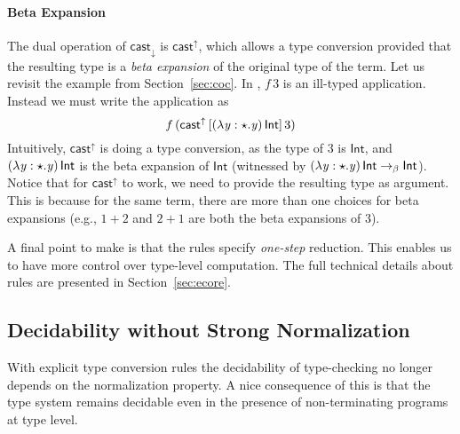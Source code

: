\paragraph{Beta Expansion} The dual operation of $ \mathsf{cast}_{\downarrow} $ is
$ \mathsf{cast}^{\uparrow} $, which allows a type conversion provided that the
resulting type is a \emph{beta expansion} of the original type of the
term.  Let us revisit the example from Section~\ref{sec:coc}. In \name,
$f\,3$ is an ill-typed application. Instead we must write the
application as
\[ f\,(\mathsf{cast}^{\uparrow} \, [  (  \lambda  \mathit{y}  :  \star  .  \mathit{y}  ) \, \mathsf{Int}  ] \,  3) \]
  Intuitively,
$ \mathsf{cast}^{\uparrow} $ is doing a type conversion, as the type of $ 3 $ is
$  \mathsf{Int}  $, and $ (  \lambda  \mathit{y}  :  \star  .  \mathit{y}  ) \, \mathsf{Int} $ is the beta expansion of
$ \mathsf{Int} $ (witnessed by
$(  \lambda  \mathit{y}  :  \star  .  \mathit{y}  ) \, \mathsf{Int} \rightarrow_{\beta}  \mathsf{Int} $).   Notice that for
$ \mathsf{cast}^{\uparrow} $ to work, we need to provide the resulting type as
argument. This is because for the same term, there are more than one
choices for beta expansions (e.g., $1 + 2$ and $2 + 1$ are both the
beta expansions of $3$).  

A final point to make is that the \cast rules specify \emph{one-step}
reduction. This enables us to have more control over type-level
computation. The full technical details about \cast rules are presented
in Section~\ref{sec:ecore}.

\subsection{Decidability without Strong Normalization}

With explicit type conversion rules the decidability of type-checking 
no longer depends on the normalization property. 
A nice consequence of this is that the type system remains decidable
even in the presence of non-terminating programs at type level.

